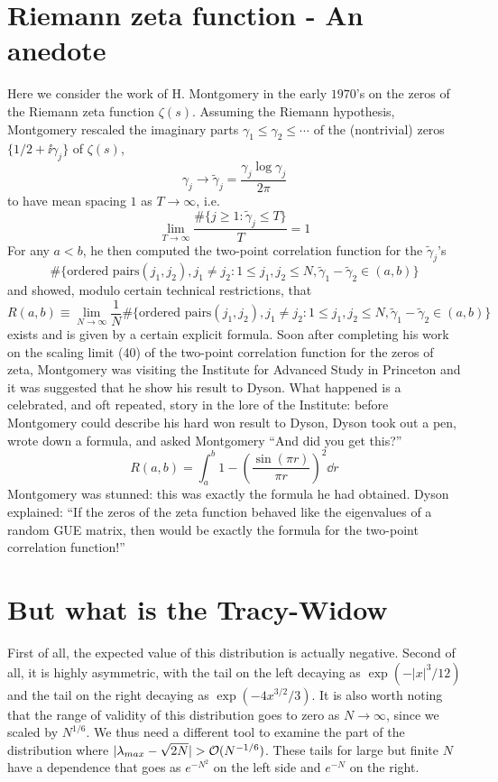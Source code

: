 \section{Riemann zeta function - An anedote}
Here we consider the work of H. Montgomery in the early $1970$’s on the zeros of the Riemann zeta function $\zeta(s)$. Assuming the Riemann hypothesis, Montgomery rescaled the imaginary parts $\gamma_1 \leq \gamma_2 \leq \cdots$ of the (nontrivial) zeros $\{ 1/2 + \ii \gamma_j\}$ of $\zeta(s)$,
\[
\gamma_j \rightarrow \tilde{\gamma}_j = \frac{\gamma_j \log{\gamma_j}}{2\pi}
\]
to have mean spacing $1$ as $T \rightarrow \infty$, i.e.
\[
\lim_{T \rightarrow \infty} \frac{\#\{j \geq 1 : \tilde{\gamma}_j \leq T\}}{T} = 1
\]
For any $a < b$, he then computed the two-point correlation function for the $\tilde{\gamma}_j$’s
\[
\#\{\text{ordered pairs} (j_1, j_2), j_1 \neq j_2 : 1 \leq j_1, j_2 \leq N, \tilde{\gamma}_1 - \tilde{\gamma}_2 \in (a, b)\}
\]
and showed, modulo certain technical restrictions, that
\[
R(a, b) \equiv \lim_{N \rightarrow \infty}\frac{1}{N} \#\{\text{ordered pairs} (j_1, j_2), j_1 \neq j_2 : 1 \leq j_1, j_2 \leq N, \tilde{\gamma}_1 - \tilde{\gamma}_2 \in (a, b)\}
\]
exists and is given by a certain explicit formula. Soon after completing his work on the scaling limit (40) of the two-point correlation function for the zeros of zeta, Montgomery was visiting the Institute for Advanced Study in Princeton and it was suggested that he show his result to Dyson. What happened is a celebrated, and oft repeated, story in the lore of the Institute: before Montgomery could describe his hard won result to Dyson, Dyson took out
a pen, wrote down a formula, and asked Montgomery “And did you get this?”
\[
R(a, b) = \int_{a}^{b} 1 - \left( \frac{\sin(\pi r)}{\pi r}\right)^2 \dd r
\]
Montgomery was stunned: this was exactly the formula he had obtained. Dyson explained: “If the zeros of the zeta function behaved like the eigenvalues of a random GUE matrix, then would be exactly the formula for the two-point correlation function!”

\section{But what is the Tracy-Widow}

First of all, the expected value of this distribution is actually negative. Second of all, it is highly asymmetric, with the tail on the left decaying as $\exp(-|x|^3 /12)$ and the tail on the right decaying as $\exp(-4x^{3/2}/3)$. It is also worth noting that the range of validity of this distribution goes to zero as $N \rightarrow \infty$, since we scaled by $N^{1/6}$. We thus need a different tool to examine the part of the distribution where $|\lambda_{max} - \sqrt{2N} | > \mathcal{O}(N^{-1/6})$. These tails for large but finite $N$ have a dependence that goes as $e^{-N^2}$ on the left side and $e^{-N}$ on the right.

